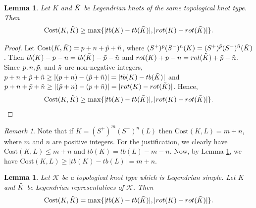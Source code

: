 \documentclass[11pt]{amsart}
\numberwithin{equation}{section}
\theoremstyle{plain}
\newtheorem{Lemma}[equation]{Lemma}
\theoremstyle{definition}
\theoremstyle{remark} \newtheorem{remark}[equation]{Remark}
\theoremstyle{remark} \newtheorem{observation}[equation]{Observation}
\newcommand{\Cost}{\text{Cost}}
\DeclarePairedDelimiter{\abs}{\lvert}{\rvert}%
\begin{document}
\begin{Lemma}\label{CostL8}
    Let $K$ and $\Tilde{K}$ be Legendrian knots of the same topological knot type. Then $$\Cost(K,\Tilde{K})\geq \max\{\abs{tb(K)-tb(\Tilde{K})},\abs{rot(K)-rot(\Tilde{K})}\}.$$
\end{Lemma}
\begin{proof}
    Let $\Cost(K,\Tilde{K})=p+n+\Tilde{p}+\Tilde{n}$, where $(S^+)^{p}(S^-)^{n}(K)=(S^+)^{\Tilde{p}}(S^-)^{\Tilde{n}}(\Tilde{K})$. Then $tb(K)-p-n=tb(\Tilde{K})-\Tilde{p}-\Tilde{n}$ and $rot(K)+p-n=rot(\Tilde{K})+\Tilde{p}-\Tilde{n}$. Since $p,n,\Tilde{p},$ and $ \Tilde{n}$ are non-negative integers, $p+n+\Tilde{p}+\Tilde{n}\geq |(p+n)-(\Tilde{p}+\Tilde{n})|=\abs{tb(K)-tb(\Tilde{K})}$ and $p+n+\Tilde{p}+\Tilde{n}\geq |(\Tilde{p}+n)-(p+\Tilde{n})|=\abs{rot(K)-rot(\Tilde{K})}$. Hence, $$\Cost(K,\Tilde{K})\geq \max\{\abs{tb(K)-tb(\Tilde{K})},\abs{rot(K)-rot(\Tilde{K})}\}.$$

\end{proof}
\begin{remark}\label{NewRemark2}
 Note that if $K=(S^+)^m(S^-)^n(L)$ then $\Cost(K,L)=m+n$, where $m$ and $n$ are positive integers. For the justification, we clearly have $
   \Cost(K,L)\leq m+n$ and $tb(K)=tb(L)-m-n$. Now, by Lemma \ref{CostL8}, we have $\Cost(K,L)\geq |tb(K)-tb(L)|= m+n$.
\end{remark}
\begin{Lemma}\label{CostL9}
    Let $\mathcal{K}$ be a topological knot type which is Legendrian simple. Let $K$ and $\Tilde{K}$ be Legendrian representatives of $\mathcal{K}$. Then 
$$\Cost(K,\Tilde{K})=\max\{\abs{tb(K)-tb(\Tilde{K})},\abs{rot(K)-rot(\Tilde{K})}\}.$$
\end{Lemma}
    
\end{document}
